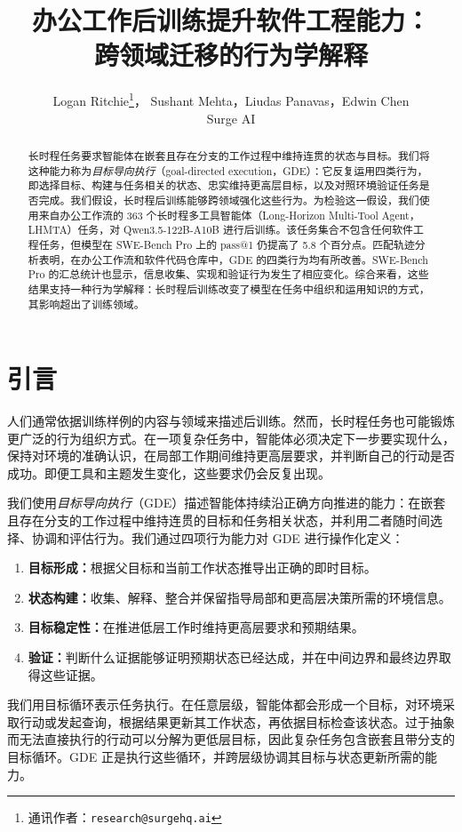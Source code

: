 \documentclass[10pt]{article}
\title{\textbf{办公工作后训练提升软件工程能力：\\跨领域迁移的行为学解释}}
\author{
  Logan Ritchie\thanks{通讯作者：\texttt{research@surgehq.ai}}，
  Sushant Mehta，Liudas Panavas，Edwin Chen\\
  Surge AI
}
\date{}
\begin{document}
\maketitle

\begin{abstract}
长时程任务要求智能体在嵌套且存在分支的工作过程中维持连贯的状态与目标。我们将这种能力称为\emph{目标导向执行}（goal-directed execution，GDE）：它反复运用四类行为，即选择目标、构建与任务相关的状态、忠实维持更高层目标，以及对照环境验证任务是否完成。我们假设，长时程后训练能够跨领域强化这些行为。为检验这一假设，我们使用来自办公工作流的 363 个长时程多工具智能体（Long-Horizon Multi-Tool Agent，LHMTA）任务，对 Qwen3.5-122B-A10B 进行后训练。该任务集合不包含任何软件工程任务，但模型在 SWE-Bench Pro 上的 pass@1 仍提高了 5.8 个百分点。匹配轨迹分析表明，在办公工作流和软件代码仓库中，GDE 的四类行为均有所改善。SWE-Bench Pro 的汇总统计也显示，信息收集、实现和验证行为发生了相应变化。综合来看，这些结果支持一种行为学解释：长时程后训练改变了模型在任务中组织和运用知识的方式，其影响超出了训练领域。
\end{abstract}

\section{引言}
\label{sec:intro}

人们通常依据训练样例的内容与领域来描述后训练。然而，长时程任务也可能锻炼更广泛的行为组织方式。在一项复杂任务中，智能体必须决定下一步要实现什么，保持对环境的准确认识，在局部工作期间维持更高层要求，并判断自己的行动是否成功。即便工具和主题发生变化，这些要求仍会反复出现。

我们使用\emph{目标导向执行}（GDE）描述智能体持续沿正确方向推进的能力：在嵌套且存在分支的工作过程中维持连贯的目标和任务相关状态，并利用二者随时间选择、协调和评估行为。我们通过四项行为能力对 GDE 进行操作化定义：

\begin{enumerate}
  \item \textbf{目标形成：}根据父目标和当前工作状态推导出正确的即时目标。
  \item \textbf{状态构建：}收集、解释、整合并保留指导局部和更高层决策所需的环境信息。
  \item \textbf{目标稳定性：}在推进低层工作时维持更高层要求和预期结果。
  \item \textbf{验证：}判断什么证据能够证明预期状态已经达成，并在中间边界和最终边界取得这些证据。
\end{enumerate}

我们用目标循环表示任务执行。在任意层级，智能体都会形成一个目标，对环境采取行动或发起查询，根据结果更新其工作状态，再依据目标检查该状态。过于抽象而无法直接执行的行动可以分解为更低层目标，因此复杂任务包含嵌套且带分支的目标循环。GDE 正是执行这些循环，并跨层级协调其目标与状态更新所需的能力。
\end{document}
